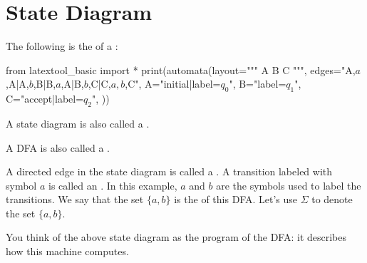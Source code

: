 \section{State Diagram}

The following is the
of a
\sidebarskip{16pt}\sidebarskip{0pt}:

\begin{python}
from latextool_basic import *
print(automata(layout="""
A  B  C
""",
edges="A,$a$,A|A,$b$,B|B,$a$,A|B,$b$,C|C,$a,b$,C",
A="initial|label=$q_0$",
B="label=$q_1$",
C="accept|label=$q_2$",
))
\end{python}

A state diagram is also called a .

A DFA is also called a
\sidebarskip{16pt}\sidebarskip{0pt}.


A directed edge in the state diagram is called a
.
A transition labeled with symbol $a$ is called an
.
In this example, $a$ and $b$ are the symbols used to label the transitions.
We say that the set $\{a, b\}$ is the  of this DFA.
Let's use $\Sigma$ to denote the set $\{a, b\}$.

You think of the above state diagram as the program of the DFA:
it describes how this machine computes.


